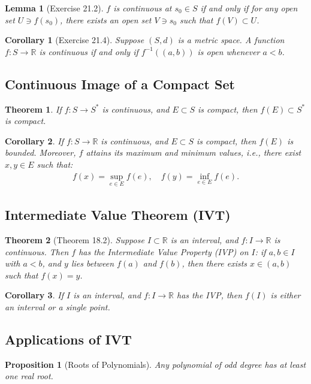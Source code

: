 \documentclass[9pt]{article}
\theoremstyle{definition}
\theoremstyle{plain}
\newtheorem{theorem}{Theorem}
\newtheorem{proposition}{Proposition}
\newtheorem{corollary}{Corollary}
\newtheorem{lemma}{Lemma}
\begin{document}
\begin{lemma}[Exercise 21.2]
$ f $ is continuous at $ s_0 \in S $ if and only if for any open set $ U \ni f(s_0) $, there exists an open set $ V \ni s_0 $ such that $ f(V) \subset U $.
\end{lemma}

\begin{corollary}[Exercise 21.4]
Suppose $ (S, d) $ is a metric space. A function $ f : S \to \mathbb{R} $ is continuous if and only if $ f^{-1}((a, b)) $ is open whenever $ a < b $.
\end{corollary}

\subsection*{Continuous Image of a Compact Set}
\begin{theorem}
If $ f : S \to S^* $ is continuous, and $ E \subset S $ is compact, then $ f(E) \subset S^* $ is compact.
\end{theorem}

\begin{corollary}
If $ f : S \to \mathbb{R} $ is continuous, and $ E \subset S $ is compact, then $ f(E) $ is bounded. Moreover, $ f $ attains its maximum and minimum values, i.e., there exist $ x, y \in E $ such that:
\begin{align}
f(x) = \sup_{e \in E} f(e), \quad f(y) = \inf_{e \in E} f(e).
\end{align}
\end{corollary}

\subsection*{Intermediate Value Theorem (IVT)}
\begin{theorem}[Theorem 18.2]
Suppose $ I \subset \mathbb{R} $ is an interval, and $ f : I \to \mathbb{R} $ is continuous. Then $ f $ has the Intermediate Value Property (IVP) on $ I $: if $ a, b \in I $ with $ a < b $, and $ y $ lies between $ f(a) $ and $ f(b) $, then there exists $ x \in (a, b) $ such that $ f(x) = y $.
\end{theorem}

\begin{corollary}
If $ I $ is an interval, and $ f : I \to \mathbb{R} $ has the IVP, then $ f(I) $ is either an interval or a single point.
\end{corollary}

\subsection*{Applications of IVT}
\begin{proposition}[Roots of Polynomials]
Any polynomial of odd degree has at least one real root.
\end{proposition}
\end{document}
